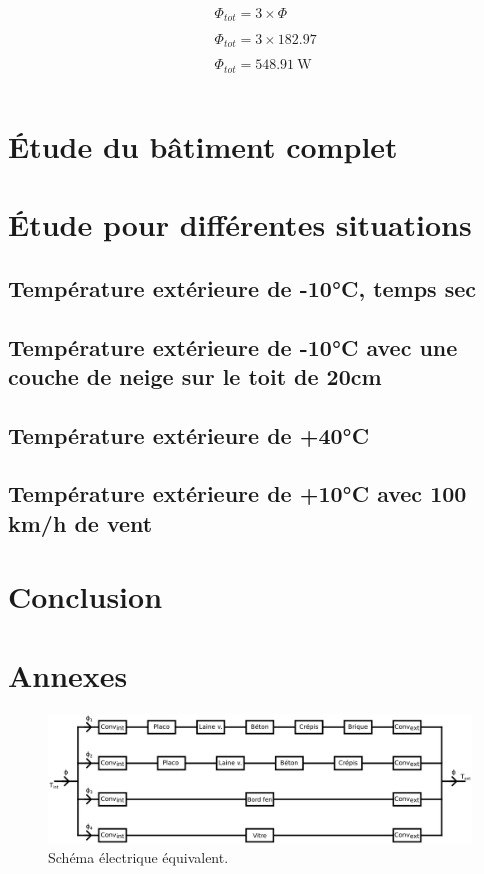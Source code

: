\documentclass[12pt, a4paper]{article}
\newcommand{\phiTot}{\ensuremath{\Phi_{tot}}}
\begin{document}
\begin{align*}
 & \phiTot = 3 \times \Phi \\ \\
 & \phiTot = 3 \times 182.97 \\ \\
 & \boxed{\phiTot = \SI{548.91}{\watt}} \\ \\
\end{align*}

\section{Étude du bâtiment complet}

\section{Étude pour différentes situations}

\subsection{Température extérieure de -10°C, temps sec}

\subsection{Température extérieure de -10°C avec une couche de neige sur le toit de 20cm}

\subsection{Température extérieure de +40°C}

\subsection{Température extérieure de +10°C avec 100 km/h de vent}

\section{Conclusion}

\newpage

\phantom{.}
\vfill
\centering

\section{Annexes}

\vfill

\newpage

\begin{figure}
 \centering
 \includegraphics[width=\textwidth]{Schémas/Schéma - Équivalence électrique.png}
 \caption{Schéma électrique équivalent.}
 \label{Schéma - équivalent}
\end{figure}
\end{document}
